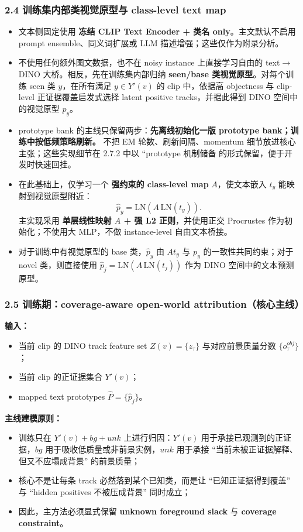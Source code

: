 \documentclass[UTF8]{ctexart}
\begin{document}
\subsubsection*{2.4 训练集内部类视觉原型与 class-level text map}
\begin{itemize}
\item 文本侧固定使用 \textbf{冻结 CLIP Text Encoder + 类名 only}。主文默认不启用 prompt ensemble、同义词扩展或 LLM 描述增强；这些仅作为附录分析。
\item 不使用任何额外图文数据，也不在 noisy instance 上直接学习自由的 text$\rightarrow$DINO 大桥。相反，先在训练集内部归纳 \textbf{seen/base 类视觉原型}。对每个训练 seen 类 $y$，在所有满足 $y\in Y'(v)$ 的 clip 中，依据高 objectness 与 clip-level 正证据覆盖启发式选择 latent positive tracks，并据此得到 DINO 空间中的视觉原型 $p_y$。
\item prototype bank 的主线只保留两步：\textbf{先离线初始化一版 prototype bank；训练中按低频策略刷新。} 不把 EM 轮数、刷新间隔、momentum 细节放进核心主张；这些实现细节在 2.7.2 中以 ``prototype 机制储备 的形式保留，便于开发时快速回挂。
\item 在此基础上，仅学习一个 \textbf{强约束的 class-level map} $A$，使文本嵌入 $t_y$ 能映射到视觉原型附近：
\[
\hat p_y = \mathrm{LN}(A\,\mathrm{LN}(t_y)).
\]
主实现采用 \textbf{单层线性映射 $A$ + 强 L2 正则}，并使用正交 Procrustes 作为初始化；不使用大 MLP，不做 instance-level 自由文本桥接。
\item 对于训练中有视觉原型的 base 类，$\hat p_y$ 由 $At_y$ 与 $p_y$ 的一致性共同约束；对于 novel 类，则直接使用 $\hat p_j=\mathrm{LN}(A\,\mathrm{LN}(t_j))$ 作为 DINO 空间中的文本预测原型。
\end{itemize}

\subsubsection*{2.5 训练期：coverage-aware open-world attribution（核心主线）}
\textbf{输入：}
\begin{itemize}
\item 当前 clip 的 DINO track feature set $Z(v)=\{z_\tau\}$ 与对应前景质量分数 $\{o_\tau^{obj}\}$；
\item 当前 clip 的正证据集合 $Y'(v)$；
\item mapped text prototypes $\hat P=\{\hat p_j\}$。
\end{itemize}

\textbf{主线建模原则：}
\begin{itemize}
\item 训练只在 \textbf{$Y'(v)+bg+unk$} 上进行归因：$Y'(v)$ 用于承接已观测到的正证据，$bg$ 用于吸收低质量或非前景实例，$unk$ 用于承接 ``当前未被正证据解释、但又不应塌成背景'' 的前景质量；
\item 核心不是让每条 track 必然落到某个已知类，而是让 ``已知正证据得到覆盖'' 与 ``hidden positives 不被压成背景'' 同时成立；
\item 因此，主方法必须显式保留 \textbf{unknown foreground slack} 与 \textbf{coverage constraint}。
\end{itemize}
\end{document}
